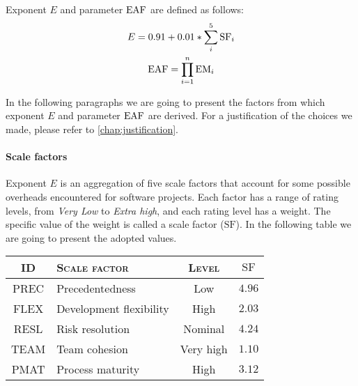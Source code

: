 Exponent $ E $ and parameter $ \text{EAF} $ are defined as follows:
\begin{gather}
%
	E = 0.91 + 0.01 * \sum_{i}^{5} \text{SF}_i \label{eqn:Eexp}\\%
%
	\eaf     = \prod_{i=1}^{n} \text{EM}_i \label{eqn:eaf}
%
\end{gather}




In the following paragraphs we are going to present the factors from which exponent $ E $ and parameter $ \text{EAF} $ are derived. For a justification of the choices we made, please refer to \cref{chap:justification}.









\paragraph{Scale factors} Exponent $ E $ is an aggregation of five scale factors that account for some possible overheads encountered for software projects. Each factor has a range of rating levels, from \emph{Very Low} to \emph{Extra high}, and each rating level has a weight. The specific value of the weight is called a scale factor ($ \text{SF} $). In the following table we are going to present the adopted values.



\begin{table}\begin{tabularx}{\textwidth}{ >{\ttfamily}c X c c }

\toprule
\normalfont\textsc{ID} & \normalfont\textsc{Scale factor} & \normalfont\textsc{Level} & $ \text{SF} $ \\
\toprule
PREC	& Precedentedness			& Low		& $ 4.96 $ \\ \midrule
FLEX	& Development flexibility	& High		& $ 2.03 $ \\ \midrule
RESL	& Risk resolution			& Nominal	& $ 4.24 $\\ \midrule
TEAM	& Team cohesion				& Very high	& $ 1.10 $\\ \midrule
PMAT	& Process maturity			& High		& $ 3.12 $\\ 

\bottomrule
	
\end{tabularx}
\end{table}




